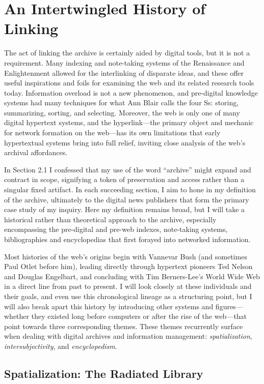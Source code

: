 \chapter{An Intertwingled History of Linking}

The act of linking the archive is certainly aided by digital tools, but it is not a requirement. Many indexing and note-taking systems of the Renaissance and Enlightenment allowed for the interlinking of disparate ideas, and these offer useful inspirations and foils for examining the web and its related research tools today. Information overload is not a new phenomenon, and pre-digital knowledge systems had many techniques for what Ann Blair calls the four Ss: storing, summarizing, sorting, and selecting.\autocite[85]{blair_note_2004} Moreover, the web is only one of many digital hypertext systems, and the hyperlink---the primary object and mechanic for network formation on the web---has its own limitations that early hypertextual systems bring into full relief, inviting close analysis of the web's archival affordances.

In Section 2.1 I confessed that my use of the word ``archive'' might expand and contract in scope, signifying a token of preservation and access rather than a singular fixed artifact. In each succeeding section, I aim to hone in my definition of the archive, ultimately to the digital news publishers that form the primary case study of my inquiry. Here my definition remains broad, but I will take a historical rather than theoretical approach to the archive, especially encompassing the pre-digital and pre-web indexes, note-taking systems, bibliographies and encyclopedias that first forayed into networked information.

Most histories of the web's origins begin with Vannevar Bush (and sometimes Paul Otlet before him), leading directly through hypertext pioneers Ted Nelson and Douglas Engelbart, and concluding with Tim Berners-Lee's World Wide Web in a direct line from past to present. I will look closely at these individuals and their goals, and even use this chronological lineage as a structuring point, but I will also break apart this history by introducing other systems and figures---whether they existed long before computers or after the rise of the web---that point towards three corresponding themes. These themes recurrently surface when dealing with digital archives and information management: \emph{spatialization}, \emph{intersubjectivity}, and \emph{encyclopedism}.

\section{Spatialization: The Radiated Library}

